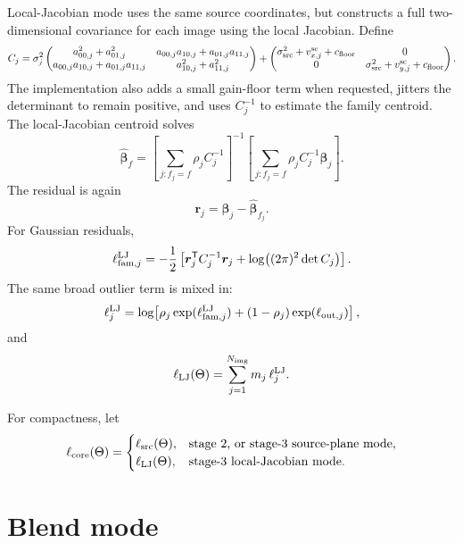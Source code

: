 \documentclass[11pt]{article}
\begin{document}
Local-Jacobian mode uses the same source coordinates, but constructs a full
two-dimensional covariance for each image using the local Jacobian. Define
\[
    C_j =
    \sigma_j^2
    \begin{pmatrix}
    a_{00,j}^2+a_{01,j}^2 &
    a_{00,j}a_{10,j}+a_{01,j}a_{11,j}\\
    a_{00,j}a_{10,j}+a_{01,j}a_{11,j} &
    a_{10,j}^2+a_{11,j}^2
    \end{pmatrix}
    +
    \begin{pmatrix}
    \sigma_{\rm src}^2+v_{x,j}^{\rm sc}+c_{\rm floor} & 0\\
    0 & \sigma_{\rm src}^2+v_{y,j}^{\rm sc}+c_{\rm floor}
    \end{pmatrix}.
\]
The implementation also adds a small gain-floor term when requested, jitters
the determinant to remain positive, and uses $C_j^{-1}$ to estimate the
family centroid. The local-Jacobian centroid solves
\[
    \widehat{\bm{\beta}}_f
    =
    \left[
        \sum_{j:f_j=f}\rho_j C_j^{-1}
    \right]^{-1}
    \left[
        \sum_{j:f_j=f}\rho_j C_j^{-1}\bm{\beta}_j
    \right].
\]
The residual is again
\[
    \bm{r}_j =
    \bm{\beta}_j - \widehat{\bm{\beta}}_{f_j}.
\]
For Gaussian residuals,
\[
    \ell_{{\rm fam},j}^{\rm LJ}
    =
    -\frac{1}{2}
    \left[
        \bm{r}_j^{\mathsf T}C_j^{-1}\bm{r}_j
        +
        \log\!\left((2\pi)^2\det C_j\right)
    \right].
\]
The same broad outlier term is mixed in:
\[
    \ell_j^{\rm LJ}
    =
    \log\!\left[
        \rho_j \exp(\ell_{{\rm fam},j}^{\rm LJ})
        +
        (1-\rho_j)\exp(\ell_{{\rm out},j})
    \right],
\]
and
\[
    \ell_{\rm LJ}(\Theta)
    =
    \sum_{j=1}^{N_{\rm img}} m_j\,\ell_j^{\rm LJ}.
\]

For compactness, let
\[
    \ell_{\rm core}(\Theta)
    =
    \begin{cases}
    \ell_{\rm src}(\Theta), & \text{stage 2, or stage-3 source-plane mode},\\
    \ell_{\rm LJ}(\Theta), & \text{stage-3 local-Jacobian mode}.
    \end{cases}
\]

\section{Blend mode}
\end{document}
